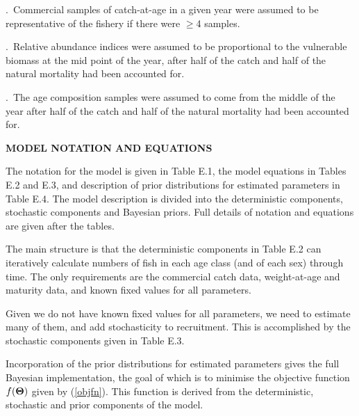 \documentclass[11pt]{article}   %
\def\AppLet{E}                   %
\def\bfTh{{\bf \Theta}}          %
\newcommand{\eref}[1]{(\ref{#1})}
\begin{document}
.~Commercial samples of catch-at-age in a given year were assumed to be representative of the fishery if there were $\geq$4 samples.

.~Relative abundance indices were assumed to be proportional to the vulnerable biomass at the mid point of the year, after half of the catch and half of the natural mortality had been accounted for.

.~The age composition samples were assumed to come from the middle of the year after half of the catch and half of the natural mortality had been accounted for.

{ \bf MODEL NOTATION AND EQUATIONS}

The notation for the model is given in Table \AppLet.1, the model equations in Tables \AppLet.2 and \AppLet.3, and description of prior distributions for estimated parameters in Table \AppLet.4. The model description is divided into the deterministic components, stochastic components and Bayesian priors. Full details of notation and equations are given after the tables. %


The main structure is that the deterministic components in Table \AppLet.2 can iteratively calculate numbers of fish in each age class (and of each sex) through time. The only requirements are the commercial catch data, weight-at-age and maturity data, and known fixed values for all parameters.

Given we do not have known fixed values for all parameters, we need to estimate many of them, and add stochasticity to recruitment. This is accomplished by the stochastic components given in Table \AppLet.3. 

Incorporation of the prior distributions for estimated parameters gives the full Bayesian implementation, the goal of which is to minimise the objective function $f(\bfTh)$ given by \eref{objfn}. This function is derived from the deterministic, stochastic and prior components of the model. %




\clearpage

\end{document}
